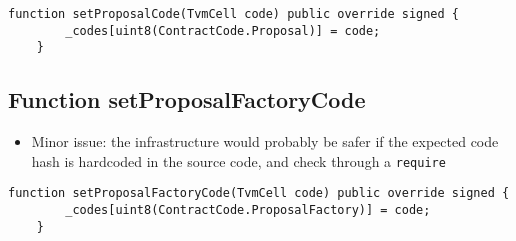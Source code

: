 \begin{lstlisting}[firstnumber=16]
    function setProposalCode(TvmCell code) public override signed {
        _codes[uint8(ContractCode.Proposal)] = code;
    }
\end{lstlisting}

\subsection{Function setProposalFactoryCode}

\begin{itemize}
\item Minor issue: the infrastructure would probably be safer if the
  expected code hash is hardcoded in the source code, and check
  through a {\tt require}
\end{itemize}

\begin{lstlisting}[firstnumber=22]
    function setProposalFactoryCode(TvmCell code) public override signed {
        _codes[uint8(ContractCode.ProposalFactory)] = code;
    }
\end{lstlisting}
